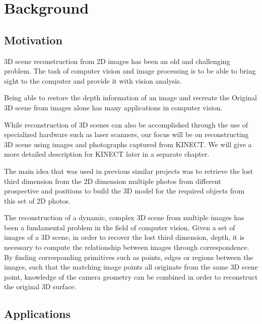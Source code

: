 \chapter{Background}

\section{Motivation}

3D scene reconstruction from 2D images has been an old and challenging problem. The task of computer vision and image processing is to be able to bring sight to the computer and provide it with vision analysis.

Being able to restore the depth information of an image and recreate the
Original 3D scene from images alone has many applications in computer vision.

While reconstruction of 3D scenes can also be accomplished through the use of specialized hardware such as laser scanners, our focus will be on reconstructing 3D scene using images and photographs captured from KINECT. We will give a more detailed description for KINECT later in a separate chapter.

The main idea that was used in previous similar projects was to retrieve the lost third dimension from the 2D dimension multiple photos from different prospective and positions to build the 3D model for the required objects from this set of 2D photos.

The reconstruction of a dynamic, complex 3D scene from multiple images has been a fundamental problem in the field of computer vision. Given a set of images of a 3D scene, in order to recover the lost third dimension, depth, it is necessary to compute the relationship between images through correspondence. By finding corresponding primitives such as points, edges or regions between the images, such that the matching image points all originate from the same 3D scene point, knowledge of the camera geometry can be combined in order to reconstruct the original 3D surface.


\section{Applications}

